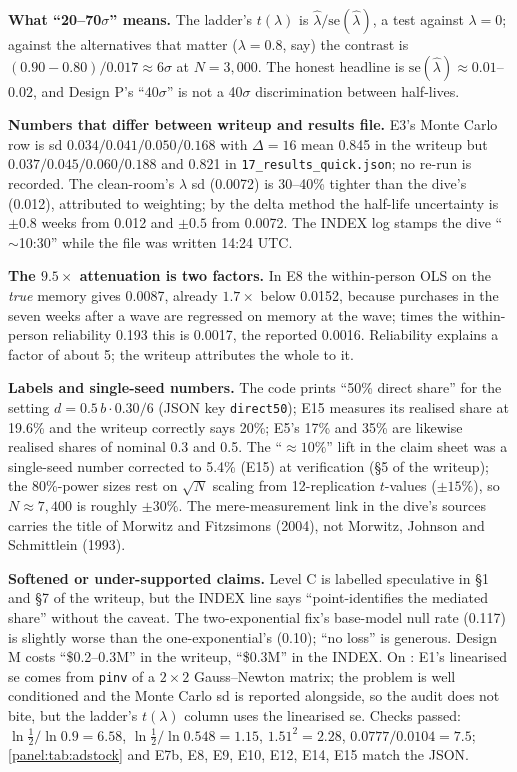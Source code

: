\begin{reviewernote}[(compiler)]
\textbf{What ``20--70$\sigma$'' means.} The ladder's $t(\lambda)$ is $\hat\lambda/\mathrm{se}(\hat\lambda)$, a test against $\lambda = 0$; against the alternatives that matter ($\lambda = 0.8$, say) the contrast is $(0.90 - 0.80)/0.017 \approx 6\sigma$ at $N = 3{,}000$. The honest headline is $\mathrm{se}(\hat\lambda) \approx 0.01$--$0.02$, and Design P's ``40$\sigma$'' is not a 40$\sigma$ discrimination between half-lives.

\textbf{Numbers that differ between writeup and results file.} E3's Monte Carlo row is sd $0.034/0.041/0.050/0.168$ with $\Delta = 16$ mean 0.845 in the writeup but $0.037/0.045/0.060/0.188$ and 0.821 in \texttt{17\_results\_quick.json}; no re-run is recorded. The clean-room's $\lambda$ sd (0.0072) is 30--40\% tighter than the dive's (0.012), attributed to weighting; by the delta method the half-life uncertainty is $\pm 0.8$ weeks from 0.012 and $\pm 0.5$ from 0.0072. The INDEX log stamps the dive ``$\sim$10:30'' while the file was written 14:24 UTC.

\textbf{The $9.5\times$ attenuation is two factors.} In E8 the within-person OLS on the \emph{true} memory gives 0.0087, already $1.7\times$ below 0.0152, because purchases in the seven weeks after a wave are regressed on memory at the wave; times the within-person reliability 0.193 this is 0.0017, the reported 0.0016. Reliability explains a factor of about 5; the writeup attributes the whole to it.

\textbf{Labels and single-seed numbers.} The code prints ``50\% direct share'' for the setting $d = 0.5\,b \cdot 0.30/6$ (JSON key \texttt{direct50}); E15 measures its realised share at 19.6\% and the writeup correctly says 20\%; E5's 17\% and 35\% are likewise realised shares of nominal 0.3 and 0.5. The ``$\approx 10\%$'' lift in the claim sheet was a single-seed number corrected to 5.4\% (E15) at verification (\S5 of the writeup); the 80\%-power sizes rest on $\sqrt N$ scaling from 12-replication $t$-values ($\pm 15\%$), so $N \approx 7{,}400$ is roughly $\pm 30\%$. The mere-measurement link in the dive's sources carries the title of Morwitz and Fitzsimons (2004), not Morwitz, Johnson and Schmittlein (1993).

\textbf{Softened or under-supported claims.} Level C is labelled speculative in \S1 and \S7 of the writeup, but the INDEX line says ``point-identifies the mediated share'' without the caveat. The two-exponential fix's base-model null rate (0.117) is slightly worse than the one-exponential's (0.10); ``no loss'' is generous. Design M costs ``\$0.2--0.3M'' in the writeup, ``\$0.3M'' in the INDEX. On : E1's linearised se comes from \texttt{pinv} of a $2 \times 2$ Gauss--Newton matrix; the problem is well conditioned and the Monte Carlo sd is reported alongside, so the audit does not bite, but the ladder's $t(\lambda)$ column uses the linearised se. Checks passed: $\ln\tfrac12/\ln 0.9 = 6.58$, $\ln\tfrac12/\ln 0.548 = 1.15$, $1.51^2 = 2.28$, $0.0777/0.0104 = 7.5$; \cref{panel:tab:adstock} and E7b, E8, E9, E10, E12, E14, E15 match the JSON.
\end{reviewernote}

